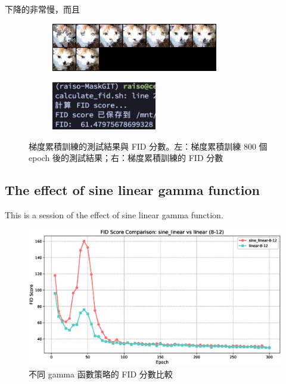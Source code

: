 下降的非常慢，而且

\begin{figure}[h]
    \centering
    \begin{subfigure}{0.48\textwidth}
        \centering
        \includegraphics[width=\textwidth, height=2.1cm, keepaspectratio]{figures/ag-epoch800-test_69.png}
        \label{fig:ag-epoch800-test_69}
    \end{subfigure}
    \hfill
    \begin{subfigure}{0.48\textwidth}
        \centering
        \includegraphics[width=\textwidth, height=2.1cm, keepaspectratio]{figures/ag-fid-score.png}
        \label{fig:ag-fid-score}
    \end{subfigure}
    \caption{梯度累積訓練的測試結果與 FID 分數。左：梯度累積訓練 800 個 epoch 後的測試結果；右：梯度累積訓練的 FID 分數}
    \label{fig:ag-epoch800-test}
\end{figure}




\subsection{The effect of sine linear gamma function}
This is a session of the effect of sine linear gamma function.



\begin{figure}[h]
    \centering
    \includegraphics[width=\textwidth]{figures/fid_comparison_8_12.eps}
    \caption{不同 gamma 函數策略的 FID 分數比較}
    \label{fig:fid_comparison_8_12}
\end{figure}


